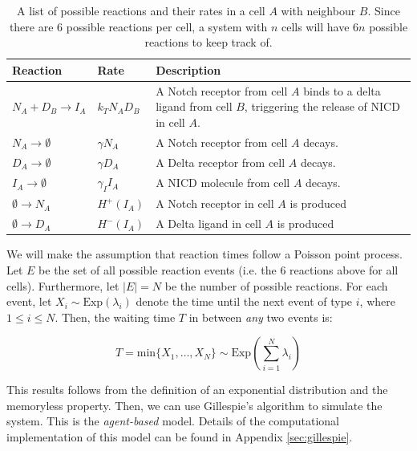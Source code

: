 \documentclass{article}
\begin{document}
\begin{flushleft}
\begin{table}[!htp]
\centering
\begin{tabular}{|m{8em}|m{5em}|m{20em}|} 
 \hline
 Reaction & Rate & Description \\ 
 \hline
 $N_{A} + D_{B} \rightarrow I_{A}$ & 
 $k_{T} N_{A}D_{B}$ &
 A Notch receptor from cell $A$ binds to a delta ligand from cell $B$, triggering the release of NICD in cell $A$. \\
 \hline
 $N_{A} \rightarrow \emptyset$ & 
 $\gamma N_{A}$ & 
 A Notch receptor from cell $A$ decays. \\
 \hline
 $D_{A} \rightarrow \emptyset$ & 
 $\gamma D_{A}$ & 
 A Delta receptor from cell $A$ decays. \\
 \hline
 $I_{A} \rightarrow \emptyset$ &
 $\gamma_{I} I_{A}$ &
 A NICD molecule from cell $A$ decays.  \\
 \hline
 $\emptyset \rightarrow N_{A}$ & 
 $H^{+}(I_{A})$ &
 A Notch receptor in cell $A$ is produced \\
 \hline
 $\emptyset \rightarrow D_{A}$ &
 $H^{-}(I_{A})$ &
 A Delta ligand in cell $A$ is produced \\
 \hline
\end{tabular}
\caption{
  A list of possible reactions and their rates in a cell $A$ with neighbour $B$.
  Since there are $6$ possible reactions per cell, a system with $n$ cells will have $6n$ possible reactions to keep track of.
}
\label{tb:reactions}
\end{table}

\medskip

We will make the assumption that reaction times follow a Poisson point process.
Let $E$ be the set of all possible reaction events (i.e. the $6$ reactions above for all cells).
Furthermore, let $|E| = N$ be the number of possible reactions.
For each event, let $X_{i} \sim \text{Exp}(\lambda_{i})$ denote the time until the next event of type $i$, where $1 \leq i \leq N$.
Then, the waiting time $T$ in between \emph{any} two events is:

$$
T = \text{min} \{ X_{1}, \dots, X_{N} \} \sim \text{Exp}\left( \sum_{i = 1}^{N} \lambda_{i} \right) 
$$

This results follows from the definition of an exponential distribution and the memoryless property.
Then, we can use Gillespie's algorithm to simulate the system.
This is the \emph{agent-based} model.
Details of the computational implementation of this model can be found in Appendix \ref{sec:gillespie}.


\end{flushleft}
\end{document}
